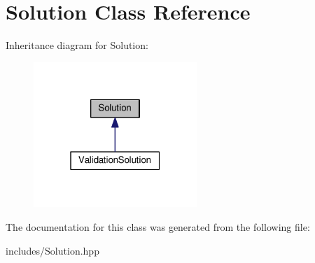 \hypertarget{class_solution}{}\section{Solution Class Reference}
\label{class_solution}


Inheritance diagram for Solution\+:\nopagebreak
\begin{figure}[H]
\begin{center}
\leavevmode
\includegraphics[width=175pt]{class_solution__inherit__graph}
\end{center}
\end{figure}


The documentation for this class was generated from the following file\+:\begin{DoxyCompactItemize}
\item 
includes/Solution.\+hpp\end{DoxyCompactItemize}
